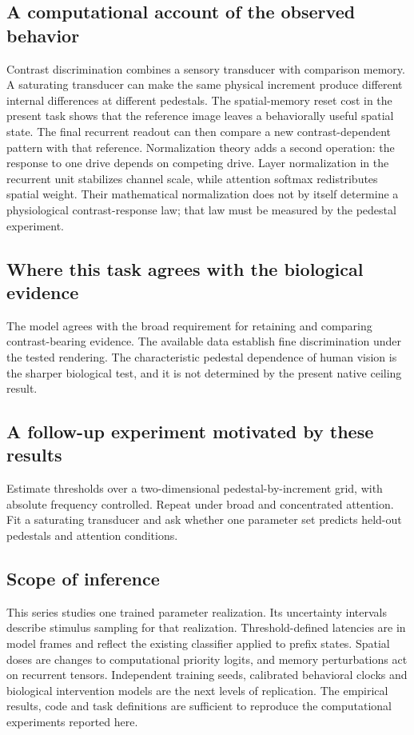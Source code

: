 \documentclass[11pt]{article}
\begin{document}
\subsection{A computational account of the observed behavior}
Contrast discrimination combines a sensory transducer with comparison memory. A saturating transducer can make the same physical increment produce different internal differences at different pedestals. The spatial-memory reset cost in the present task shows that the reference image leaves a behaviorally useful spatial state. The final recurrent readout can then compare a new contrast-dependent pattern with that reference. Normalization theory adds a second operation: the response to one drive depends on competing drive. Layer normalization in the recurrent unit stabilizes channel scale, while attention softmax redistributes spatial weight. Their mathematical normalization does not by itself determine a physiological contrast-response law; that law must be measured by the pedestal experiment. \cite{bio_normalization}

\subsection{Where this task agrees with the biological evidence}
The model agrees with the broad requirement for retaining and comparing contrast-bearing evidence. The available data establish fine discrimination under the tested rendering. The characteristic pedestal dependence of human vision is the sharper biological test, and it is not determined by the present native ceiling result.

\subsection{A follow-up experiment motivated by these results}
Estimate thresholds over a two-dimensional pedestal-by-increment grid, with absolute frequency controlled. Repeat under broad and concentrated attention. Fit a saturating transducer and ask whether one parameter set predicts held-out pedestals and attention conditions.
\subsection{Scope of inference}
This series studies one trained parameter realization. Its uncertainty intervals describe stimulus sampling for that realization. Threshold-defined latencies are in model frames and reflect the existing classifier applied to prefix states. Spatial doses are changes to computational priority logits, and memory perturbations act on recurrent tensors. Independent training seeds, calibrated behavioral clocks and biological intervention models are the next levels of replication. The empirical results, code and task definitions are sufficient to reproduce the computational experiments reported here.
\end{document}
